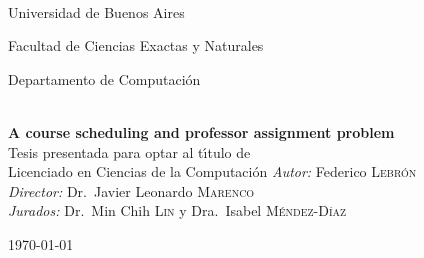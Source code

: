 \begin{titlepage}

\begin{center}


\begin{flushleft}
%
\hfill
{}\\[2.0cm]
\end{flushleft}

{\large \sc Universidad de Buenos Aires

Facultad de Ciencias Exactas y Naturales

Departamento de Computaci\'on} \\[2cm]

{ \LARGE \bfseries A course scheduling and professor assignment problem}\\[2.6cm]
{\large Tesis presentada para optar al t\'{\i}tulo de\\
Licenciado en Ciencias de la Computaci\'on}
\vfill
{\large \emph{Autor:} Federico \textsc{Lebrón}\\[0.5cm]
\emph{Director:} 
Dr.~Javier Leonardo \textsc{Marenco} \\[0.5cm]
\emph{Jurados:} 
Dr.~Min Chih \textsc{Lin} y 
Dra.~Isabel \textsc{Méndez-Díaz}
}
\vfill

{\large \today}

\end{center}
\end{titlepage}
